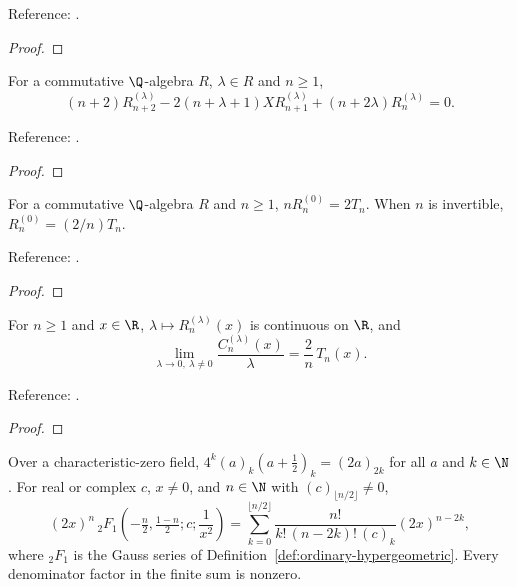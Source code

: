 \begin{supporting}
\begin{theorem}
Reference: \cite[18.5.10]{dlmf}.
\end{theorem}
\begin{proof}
\leanok
\end{proof}

\begin{theorem}
\label{thm:gegenbauer-reduced-recurrence}
\leanok
For a commutative $\Q$-algebra $R$, $\lambda\in R$ and $n\ge1$,
\[(n+2)R_{n+2}^{(\lambda)}-2(n+\lambda+1)XR_{n+1}^{(\lambda)}
 +(n+2\lambda)R_n^{(\lambda)}=0.\]

Reference: \cite[Table 18.9.1]{dlmf}.
\end{theorem}
\begin{proof}
\leanok
\end{proof}

\begin{theorem}
\label{thm:gegenbauer-reduced-chebyshev}
\leanok
For a commutative $\Q$-algebra $R$ and $n\ge1$, $nR_n^{(0)}=2T_n$. When $n$ is
invertible, $R_n^{(0)}=(2/n)T_n$.

Reference: \cite[18.1.1]{dlmf}.
\end{theorem}
\begin{proof}
\leanok
\end{proof}

\begin{theorem}
\label{thm:gegenbauer-parameter-limit}
\leanok
For $n\ge1$ and $x\in\R$, $\lambda\mapsto R_n^{(\lambda)}(x)$ is continuous on
$\R$, and
\[\lim_{\lambda\to0,\ \lambda\ne0}\frac{C_n^{(\lambda)}(x)}{\lambda}
 =\frac2n\,T_n(x).\]

Reference: \cite[\S18.7(iii)]{dlmf}.
\end{theorem}
\begin{proof}
\leanok
\end{proof}

\begin{theorem}
\label{thm:hypergeometric-inverse-square}
\leanok
Over a characteristic-zero field, $4^k(a)_k(a+\tfrac12)_k=(2a)_{2k}$ for all $a$
and $k\in\N$. For real or complex $c$, $x\ne0$, and $n\in\N$ with
$(c)_{\lfloor n/2\rfloor}\ne0$,
\[(2x)^n\,{}_2F_1\!\left(-\tfrac n2,\tfrac{1-n}2;c;\frac1{x^2}\right)
 =\sum_{k=0}^{\lfloor n/2\rfloor}\frac{n!}{k!\,(n-2k)!\,(c)_k}(2x)^{n-2k},\]
where ${}_2F_1$ is the Gauss series of Definition~\ref{def:ordinary-hypergeometric}. Every denominator factor in the finite sum is nonzero.


\end{theorem}
\end{supporting}
